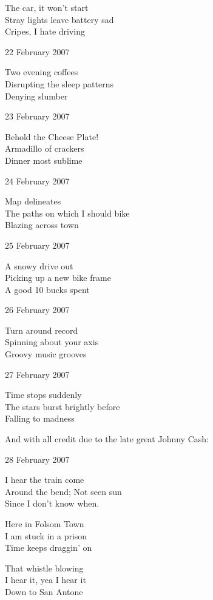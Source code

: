 \documentclass[12pt]{article}
\begin{document}
The car, it won't start \\
Stray lights leave battery sad \\
Cripes, I hate driving 

22 February 2007

Two evening coffees \\
Disrupting the sleep patterns \\
Denying slumber 

23 February 2007

Behold the Cheese Plate! \\
Armadillo of crackers \\
Dinner most sublime 

24 February 2007

Map delineates \\
The paths on which I should bike  \\
Blazing across town

25 February 2007

A snowy drive out \\
Picking up a new bike frame \\
A good 10 bucks spent

\newpage

26 February 2007

Turn around record \\
Spinning about your axis \\
Groovy music grooves

27 February 2007

Time stops suddenly \\
The stars burst brightly before \\
Falling to madness

And with all credit due to the late great Johnny Cash:

28 February 2007

I hear the train come \\
Around the bend; Not seen sun \\
Since I don't know when.

Here in Folsom Town \\                                                                     
I am stuck in a prison \\
Time keeps draggin' on 
                                                                                                                          
That whistle blowing \\ 
I hear it, yea I hear it \\
Down to San Antone 
                                                                                                       
\end{document}
